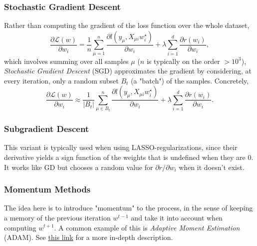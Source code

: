 \documentclass{article}
\begin{document}
\subsubsection*{Stochastic Gradient Descent}
Rather than computing the gradient of the loss function over the whole dataset,
\begin{equation}
    \frac{\partial\mathcal{L}(w)}{\partial w_i}
    =
    \frac{1}{n}\sum_{\mu = 1}^{n} \frac{\partial l(y_{\mu}, X_{\mu i} w^{\star}_i)}{\partial w_i}
    +
    \lambda \sum_{i=1}^{d} \frac{\partial r(w_i)}{\partial w_i},
\end{equation}
which involves summing over all samples $\mu$ ($n$ is typically on the order $>10^3$), \emph{Stochastic Gradient Descent} (SGD) approximates the gradient by considering, at every iteration, only a random subset $B_t$ (a "batch") of the samples. Concretely,
\begin{equation}
    \frac{\partial\mathcal{L}(w)}{\partial w_i}
    \approx
    \frac{1}{|B_t|}\sum_{\mu \in B_t}^{n} \frac{\partial l(y_{\mu}, X_{\mu i} w^{\star}_i)}{\partial w_i}
    +
    \lambda \sum_{i=1}^{d} \frac{\partial r(w_i)}{\partial w_i}.
\end{equation}

\subsubsection*{Subgradient Descent}
This variant is typically used when using LASSO-regularizations, since their derivative yields a sign function of the weights that is undefined when they are 0. It works like GD but chooses a random value for $\partial r/\partial w_i$ when it doesn't exist.
\subsubsection*{Momentum Methods}
The idea here is to introduce "momentum" to the process, in the sense of keeping a memory of the previous iteration $w^{t-1}$ and take it into account when computing $w^{t+1}$. A common example of this is \emph{Adaptive Moment Estimation} (ADAM). See \href{https://en.wikipedia.org/wiki/Stochastic_gradient_descent#Momentum}{this link} for a more in-depth description.
\end{document}
